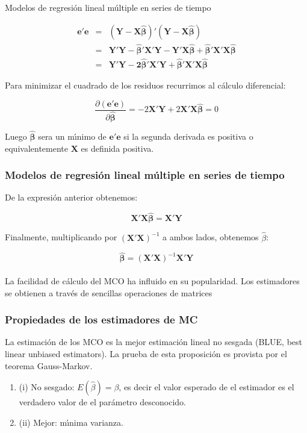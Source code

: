 \documentclass[xcolor=(list of options)]{beamer}
\begin{document}
\begin{section}{Modelos de regresi\'on lineal m\'ultiple en series de tiempo}
\begin{frame}
\begin{eqnarray*}
\mathbf{e'e} & = & \left(\mathbf{Y-X\hat{\beta}}\right)'\left(\mathbf{Y-X\hat{\beta}}\right)\\
 & = & \mathbf{Y'Y}-\mathbf{\hat{\beta}'X'Y}-\mathbf{Y'X\hat{\beta}}+\mathbf{\hat{\beta}'X'X\hat{\beta}}\\
 & = & \mathbf{Y'Y}-\mathbf{2\hat{\beta}'X'Y}+\mathbf{\hat{\beta}'X'X\hat{\beta}}
\end{eqnarray*}

Para minimizar el cuadrado de los residuos recurrimos al c\'alculo diferencial:

\[
\frac{\partial(\mathbf{e'e})}{\partial\mathbf{\hat{\beta}}}=-2\mathbf{X'Y}+2\mathbf{X'X\hat{\beta}}=0
\]

Luego $\mathbf{\hat{\beta}}$ sera un m\'\i{}nimo de \textbf{$\mathbf{e'e}$}
si la segunda derivada es positiva o equivalentemente $\mathbf{X}$
es definida positiva.

\end{frame}
\begin{frame}
\frametitle{Modelos de regresi\'on lineal m\'ultiple en series de tiempo}


De la expresi\'on anterior obtenemos:

\[
\mathbf{X'X\hat{\beta}}=\mathbf{X'Y}
\]

Finalmente, multiplicando por $(\mathbf{X'X})^{-1}$ a ambos lados, obtenemos $\hat\beta$:

\[
\mathbf{\hat\beta}=(\mathbf{X'X})^{-1}\mathbf{X'Y}
\]
\\
La facilidad de c\'alculo del MCO ha influido en su popularidad. Los estimadores se obtienen a trav\'es de sencillas operaciones de matrices 

\end{frame}
\begin{frame}
\frametitle{Propiedades de los estimadores de MC}

La estimaci\'on de los MCO es la mejor estimaci\'on lineal no sesgada (BLUE, best linear unbiased estimators). La prueba de esta proposici\'on es provista por el teorema Gauss-Markov.

\begin{enumerate}
\item (i) No sesgado: $E(\hat{\beta}) = \beta$, es decir el valor esperado de el estimador es el verdadero valor de el par\'ametro desconocido.
\item (ii) Mejor: m\'\i{}nima varianza.
\end{enumerate}


\end{frame}
\end{section}
\end{document}
